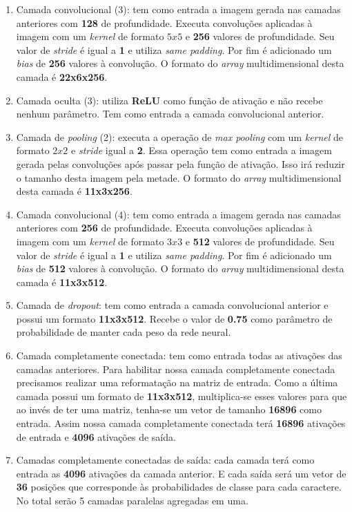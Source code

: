 \begin{enumerate}
\item Camada convolucional (3): tem como entrada a imagem gerada
  nas camadas anteriores com {\bf 128} de profundidade. Executa
  convoluções aplicadas à imagem com um \textit{kernel} de formato
  $5x5$ e {\bf 256} valores de profundidade. Seu valor de
  \textit{stride} é igual a {\bf 1} e utiliza \textit{same
    padding}. Por fim é adicionado um \textit{bias} de {\bf 256}
  valores à convolução. O formato do \textit{array} multidimensional desta
  camada é {\bf 22x6x256}.

\item Camada oculta (3): utiliza {\bf ReLU} como função de ativação e
  não recebe nenhum parâmetro. Tem como entrada a camada convolucional
  anterior.

\item Camada de \textit{pooling} (2): executa a operação de
  \textit{max pooling} com um \textit{kernel} de formato $2x2$ e
  \textit{stride} igual a {\bf 2}. Essa operação tem como entrada a
  imagem gerada pelas convoluções após passar pela função de
  ativação. Isso irá reduzir o tamanho desta imagem pela metade. O
  formato do \textit{array} multidimensional desta camada é {\bf 11x3x256}.

\item Camada convolucional (4): tem como entrada a imagem gerada
  nas camadas anteriores com {\bf 256} de profundidade. Executa
  convoluções aplicadas à imagem com um \textit{kernel} de formato
  $3x3$ e {\bf 512} valores de profundidade. Seu valor de
  \textit{stride} é igual a {\bf 1} e utiliza \textit{same
    padding}. Por fim é adicionado um \textit{bias} de {\bf 512}
  valores à convolução. O formato do \textit{array} multidimensional desta
  camada é {\bf 11x3x512}.

\item Camada de \textit{dropout}: tem como entrada a camada
  convolucional anterior e possui um formato {\bf 11x3x512}. Recebe o
  valor de {\bf 0.75} como parâmetro de probabilidade de manter cada
  peso da rede neural.

\item Camada completamente conectada: tem como entrada todas as
  ativações das camadas anteriores. Para habilitar nossa camada
  completamente conectada precisamos realizar uma reformatação na
  matriz de entrada. Como a última camada possui um formato de {\bf
    11x3x512}, multiplica-se esses valores para que ao invés de
  ter uma matriz, tenha-se um vetor de tamanho {\bf 16896} como
  entrada. Assim nossa camada completamente conectada terá {\bf 16896}
  ativações de entrada e {\bf 4096} ativações de saída.

\item Camadas completamente conectadas de saída: cada camada terá como
  entrada as {\bf 4096} ativações da camada anterior. E cada saída
  será um vetor de {\bf 36} posições que corresponde às probabilidades
  de classe para cada caractere. No total serão 5 camadas paralelas
  agregadas em uma.

\end{enumerate}

